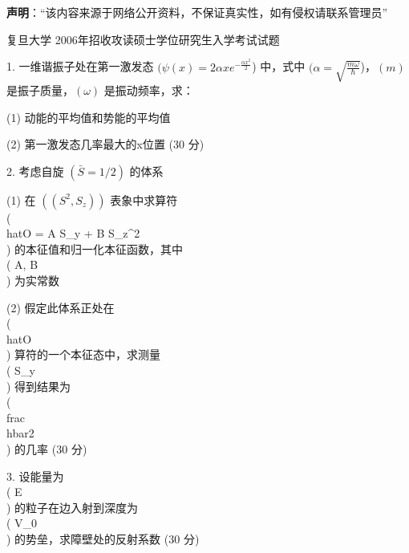 

\textbf{声明}：“该内容来源于网络公开资料，不保证真实性，如有侵权请联系管理员”

复旦大学 2006年招收攻读硕士学位研究生入学考试试题

1. 一维谐振子处在第一激发态 $( \psi (x) = 2 \alpha x e^{-\frac{\alpha x^2}{2}} $) 中，式中 $( \alpha = \sqrt{\frac{m \omega}{\hbar}}$)，$( m )$ 是振子质量，$(\omega)$ 是振动频率，求：

(1) 动能的平均值和势能的平均值

(2) 第一激发态几率最大的x位置 (30 分)

2. 考虑自旋 $(\bar{S} = 1/2)$ 的体系

(1) 在 $((S^2, S_z))$ 表象中求算符 \\( \\hat{O} = A S_y + B S_z^2 \\) 的本征值和归一化本征函数，其中 \\( A, B \\) 为实常数

(2) 假定此体系正处在 \\( \\hat{O} \\) 算符的一个本征态中，求测量 \\( S_y \\) 得到结果为 \\( \\frac{\\hbar}{2} \\) 的几率 (30 分)

3. 设能量为 \\( E \\) 的粒子在边入射到深度为 \\( V_0 \\) 的势垒，求障壁处的反射系数 (30 分)